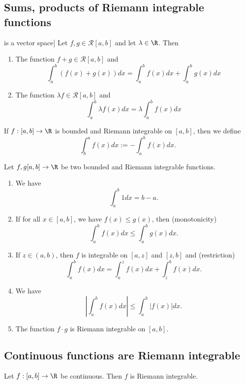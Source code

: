 \subsection{Sums, products of Riemann integrable functions}
\begin{proposition}[R[a,b] is a vector space]
    Let $f,g \in \mathcal R [a,b]$ and let $\lambda \in \R$. Then
    \begin{enumerate}
        \item The function $f+g \in \mathcal R[a,b]$ and
            $$\int_a^b(f(x)+g(x))dx = \int_a^bf(x)dx + \int_a^bg(x)dx$$
        \item The function $\lambda f \in \mathcal R[a,b]$ and
            $$\int_a^b\lambda f(x)dx = \lambda \int_a^bf(x)dx$$
    \end{enumerate}
\end{proposition}

\begin{definition}
    If $f:[a,b] \to \R$ is bounded and Riemann integrable on $[a,b]$,
    then we define
    $$\int_b^a f(x)dx := -\int_a^b f(x)dx.$$
\end{definition}

\begin{proposition}
    Let $f,g[a,b] \to \R$ be two bounded and Riemann integrable functions.
    \begin{enumerate}[label=\roman*.]
        \item We have
            $$\int_a^b1dx = b-a.$$
        \item If for all $x \in [a,b]$, we have $f(x) \le g(x)$, then \hfill (monotonicity)
            $$\int_a^bf(x)dx \le \int_a^bg(x)dx.$$
        \item If $z \in (a,b)$, then $f$ is integrable on $[a,z]$ and $[z,b]$ and \hfill (restriction)
            $$\int_a^bf(x)dx = \int_a^zf(x)dx + \int_z^bf(x)dx.$$
        \item We have\hfill {}
            $$\left|\int_a^bf(x)dx\right| \le \int_a^b|f(x)|dx. $$
        \item The function $f \cdot g$ is Riemann integrable on $[a,b]$.
    \end{enumerate}
\end{proposition}

\subsection{Continuous functions are Riemann integrable}
\begin{proposition}
    Let $f:[a,b] \to \R$ be continuous. Then $f$ is Riemann integrable.
\end{proposition}

